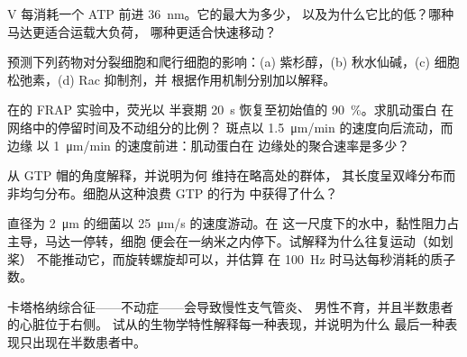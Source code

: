 \begin{exercise}[$\star\star$]\label{exo:b3:cytoskeleton-motility:7}
 V 每消耗一个 ATP 前进 \qty{36}{nm}。它的最大为多少，
以及为什么它比的低？哪种马达更适合运载大负荷，
哪种更适合快速移动？
\end{exercise}

\begin{exercise}[$\star\star$]\label{exo:b3:cytoskeleton-motility:8}
预测下列药物对分裂细胞和爬行细胞的影响：(a)
紫杉醇，(b) 秋水仙碱，(c) 细胞松弛素，(d) Rac 抑制剂，并
根据作用机制分别加以解释。
\end{exercise}

\begin{exercise}[$\star\star$]\label{exo:b3:cytoskeleton-motility:9}
在的 FRAP 实验中，荧光以
半衰期 \qty{20}{s} 恢复至初始值的 \qty{90}{\%}。求肌动蛋白
在网络中的停留时间及不动组分的比例？
斑点以 \qty{1.5}{\micro m/min} 的速度向后流动，而边缘
以 \qty{1}{\micro m/min} 的速度前进：肌动蛋白在
边缘处的聚合速率是多少？
\end{exercise}

\begin{exercise}[$\star\star\star$]\label{exo:b3:cytoskeleton-motility:10}
从 GTP 帽的角度解释，并说明为何
维持在略高处的群体，
其长度呈双峰分布而非均匀分布。细胞从这种浪费 GTP 的行为
中获得了什么？
\end{exercise}

\begin{exercise}[$\star\star\star$]\label{exo:b3:cytoskeleton-motility:11}
直径为 \qty{2}{\micro m} 的细菌以 \qty{25}{\micro m/s} 的速度游动。在
这一尺度下的水中，黏性阻力占主导，马达一停转，细胞
便会在一纳米之内停下。试解释为什么往复运动（如划桨）
不能推动它，而旋转螺旋却可以，并估算
在 \qty{100}{Hz} 时马达每秒消耗的质子数。
\end{exercise}

\begin{exercise}[$\star\star\star$]\label{exo:b3:cytoskeleton-motility:12}
卡塔格纳综合征——不动症——会导致慢性支气管炎、
男性不育，并且半数患者的心脏位于右侧。
试从的生物学特性解释每一种表现，并说明为什么
最后一种表现只出现在半数患者中。
\end{exercise}

